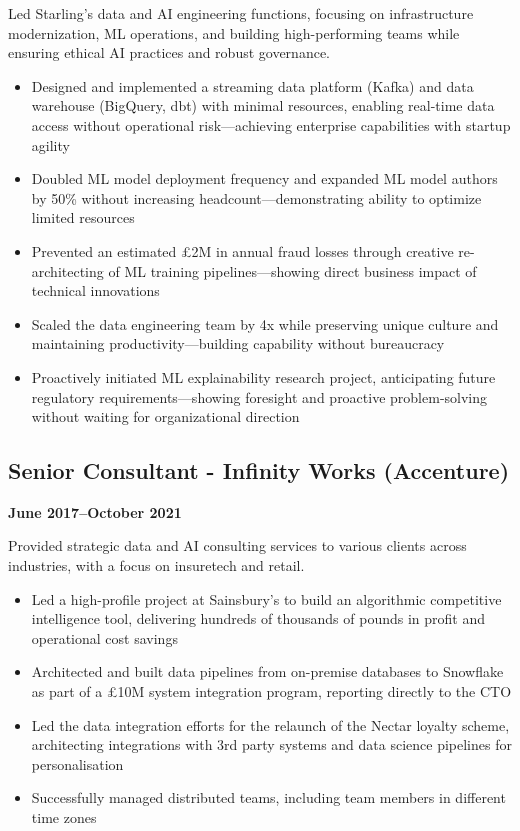 \documentclass[a4paper]{scrartcl}
\begin{document}
Led Starling's data and AI engineering functions, focusing on infrastructure modernization, ML operations, and building high-performing teams while ensuring ethical AI practices and robust governance.
\begin{itemize}
	\item Designed and implemented a streaming data platform (Kafka) and data warehouse (BigQuery, dbt) with minimal resources, enabling real-time data access without operational risk—achieving enterprise capabilities with startup agility
	\item Doubled ML model deployment frequency and expanded ML model authors by 50\% without increasing headcount—demonstrating ability to optimize limited resources
	\item Prevented an estimated £2M in annual fraud losses through creative re-architecting of ML training pipelines—showing direct business impact of technical innovations
	\item Scaled the data engineering team by 4x while preserving unique culture and maintaining productivity—building capability without bureaucracy
	\item Proactively initiated ML explainability research project, anticipating future regulatory requirements—showing foresight and proactive problem-solving without waiting for organizational direction
\end{itemize}

\subsection*{Senior Consultant - Infinity Works (Accenture)}
\textbf{June 2017--October 2021}

Provided strategic data and AI consulting services to various clients across industries, with a focus on insuretech and retail.
\begin{itemize}
	\item Led a high-profile project at Sainsbury's to build an algorithmic competitive intelligence tool, delivering hundreds of thousands of pounds in profit and operational cost savings
	\item Architected and built data pipelines from on-premise databases to Snowflake as part of a £10M system integration program, reporting directly to the CTO
	\item Led the data integration efforts for the relaunch of the Nectar loyalty scheme, architecting integrations with 3rd party systems and data science pipelines for personalisation
	\item Successfully managed distributed teams, including team members in different time zones
\end{itemize}
\end{document}
